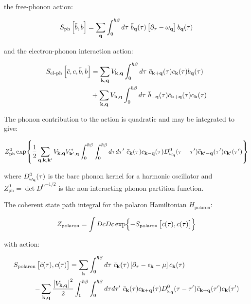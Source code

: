 the free-phonon action:

\begin{equation}
        S_{\text{ph}}\left[\Bar{b}, b\right] =  \sum_{\vb{q}} \int_0^{\hbar\beta} d\tau\ \Bar{b}_{\vb{q}}(\tau) \left[\partial_{\tau} - \omega_{\vb{q}} \right] b_{\vb{q}}(\tau)
\end{equation}

and the electron-phonon interaction action:

\begin{equation}
    \begin{aligned}
        S_{\text{el-ph}}\left[\Bar{c}, c, \Bar{b}, b\right] &=  \sum_{\vb{k},\vb{q}} V_{\vb{k}, \vb{q}} \int_0^{\hbar\beta} d\tau\ \Bar{c}_{\vb{k}+\vb{q}}(\tau) c_{\vb{k}}(\tau) b_{\vb{q}}(\tau) \\
        &+ \sum_{\vb{k},\vb{q}} V_{\vb{k}, \vb{q}} \int_0^{\hbar\beta} d\tau\ \Bar{b}_{-\vb{q}}(\tau) \Bar{c}_{\vb{k}+\vb{q}}(\tau) c_{\vb{k}}(\tau)
    \end{aligned}
\end{equation}

The phonon contribution to the action is quadratic and may be integrated to give:

\begin{equation}
    Z^0_{\text{ph}} \exp{\frac{1}{2} \sum_{\vb{q}, \vb{k}, \vb{k}'} V_{\vb{k}, \vb{q}} V^*_{\vb{k}', \vb{q}} \int_0^{\hbar\beta} \int_0^{\hbar\beta} d\tau d\tau'\ \Bar{c}_{\vb{k}}(\tau) c_{\vb{k} - \vb{q}} (\tau) D^0_{\omega_{\vb{q}}}(\tau - \tau') \Bar{c}_{\vb{k}'-\vb{q}}(\tau') c_{\vb{k}'}(\tau')}
\end{equation}

where $D^0_{\omega_{\vb{q}}}(\tau)$ is the bare phonon kernel for a harmonic oscillator and $Z^0_{\text{ph}} = \det{D^0}^{-1/2}$ is the non-interacting phonon partition function.

The coherent state path integral for the polaron Hamiltonian $H_{\text{polaron}}$:

\begin{equation}
    Z_{\text{polaron}} = \int D\Bar{c} Dc \exp{-S_{\text{polaron}}\left[\Bar{c}(\tau), c(\tau)\right]}
\end{equation}

with action:

\begin{equation}
    \begin{aligned}
        S_{\text{polaron}}\left[\Bar{c}(\tau), c(\tau)\right] =  \sum_{\vb{k}} &\int_0^{\hbar\beta} d\tau\ \Bar{c}_{\vb{k}}(\tau) \left[\partial_{\tau} - \epsilon_{\vb{k}} - \mu \right] c_{\vb{k}}(\tau) \\
        - \sum_{\vb{k}, \vb{q}} \frac{\abs{V_{\vb{k}, \vb{q}}}^2}{2} \int_0^{\hbar\beta} &\int_0^{\hbar\beta} d\tau d\tau'\ \Bar{c}_{\vb{k}}(\tau) c_{\vb{k}+\vb{q}}(\tau) D^0_{\omega_{\vb{q}}}(\tau - \tau') \Bar{c}_{\vb{k}+\vb{q}}(\tau') c_{\vb{k}}(\tau') 
    \end{aligned}
\end{equation}